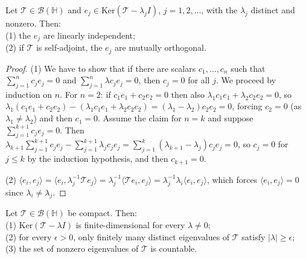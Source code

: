 \begin{theorem}
\label{thm:eigen_orthogonal}
Let $\mathcal{T}\in\mathcal{B}(\mathbb{H})$ and $e_j\in\mathrm{Ker}
(\mathcal{T}-\lambda_jI)$, $j=1,2,\dots$, with the $\lambda_j$ distinct and
nonzero. Then:\\ 
(1) the $e_j$ are linearly independent; \\
(2) if $\mathcal{T}$ is self-adjoint, the $e_j$ are mutually orthogonal.\\
\end{theorem}

\begin{proof}
(1) We have to show that if there are scalars $c_1,\dots,c_n$ such that $\sum_{j=1}^n c_je_j=0$ and $\sum_{j=1}^n \lambda c_je_j=0$, then $c_j=0$ for all $j$. We proceed by induction on $n$. For $n=2$: if $c_1e_1+c_2e_2=0$ then also
$\lambda_1c_1e_1+\lambda_2c_2e_2=0$, so $\lambda_1(c_1e_1+c_2e_2) -
(\lambda_1c_1e_1+\lambda_2c_2e_2) = (\lambda_1-\lambda_2)c_2e_2=0$, forcing
$c_2=0$ (as $\lambda_1\neq\lambda_2$) and then $c_1=0$. Assume the claim for
$n=k$ and suppose $\sum_{j=1}^{k+1}c_je_j=0$. Then
$\lambda_{k+1}\sum_{j=1}^{k+1}c_je_j - \sum_{j=1}^{k+1}\lambda_jc_je_j =
\sum_{j=1}^k(\lambda_{k+1}-\lambda_j)c_je_j = 0$, so $c_j=0$ for $j\leq k$
by the induction hypothesis, and then $c_{k+1}=0$.

(2) $\langle e_i,e_j\rangle = \langle e_i,\lambda_j^{-1}\mathcal{T}e_j
\rangle = \lambda_j^{-1}\langle\mathcal{T}e_i,e_j\rangle =
\lambda_j^{-1}\lambda_i\langle e_i,e_j\rangle$, which forces
$\langle e_i,e_j\rangle=0$ since $\lambda_i\neq\lambda_j$.
\end{proof}

\begin{theorem}
\label{thm:compact_eigen_finite}
Let $\mathcal{T}\in\mathcal{B}(\mathbb{H})$ be compact. Then: \\
(1) $\mathrm{Ker}(\mathcal{T}-\lambda I)$ is finite-dimensional for every
$\lambda\neq 0$; \\
(2) for every $\epsilon>0$, only finitely many distinct
eigenvalues of $\mathcal{T}$ satisfy $|\lambda|\geq\epsilon$; \\
(3) the set of
nonzero eigenvalues of $\mathcal{T}$ is countable.
\end{theorem}

